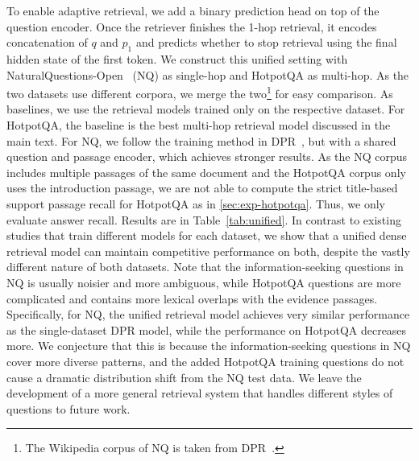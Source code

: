 To enable adaptive retrieval, we add a binary prediction head on top of the question encoder. Once the retriever finishes the 1-hop retrieval, it encodes concatenation of $q$ and $p_1$ and predicts whether to stop retrieval using the final hidden state of the first token. We construct this unified setting with NaturalQuestions-Open~\citep{ORQA} (NQ) as single-hop and HotpotQA as multi-hop. As the two datasets use different corpora, we merge the two\footnote{The Wikipedia corpus of NQ is taken from DPR~\citep{DPR}.} for easy comparison. As baselines, we use the retrieval models trained only on the respective dataset. For HotpotQA, the baseline is the best multi-hop retrieval model discussed in the main text. For NQ, we follow the training method in DPR~\citep{DPR}, but with a shared question and passage encoder, which achieves stronger results. As the NQ corpus includes multiple passages of the same document and the HotpotQA corpus only uses the introduction passage, we are not able to compute the strict title-based support passage recall for HotpotQA as in \cref{sec:exp-hotpotqa}. Thus, we only evaluate answer recall. Results are in Table~\ref{tab:unified}. In contrast to existing studies that train different models for each dataset, we show that a unified dense retrieval model can maintain competitive performance on both, despite the vastly different nature of both datasets. Note that the information-seeking questions in NQ is usually noisier and more ambiguous, while HotpotQA questions are more complicated and contains more lexical overlaps with the evidence passages. Specifically, for NQ, the unified retrieval model achieves very similar performance as the single-dataset DPR model, while the performance on HotpotQA decreases more. We conjecture that this is because the information-seeking questions in NQ cover more diverse patterns, and the added HotpotQA training questions do not cause a dramatic distribution shift from the NQ test data. We leave the development of a more general retrieval system that handles different styles of questions to future work.

